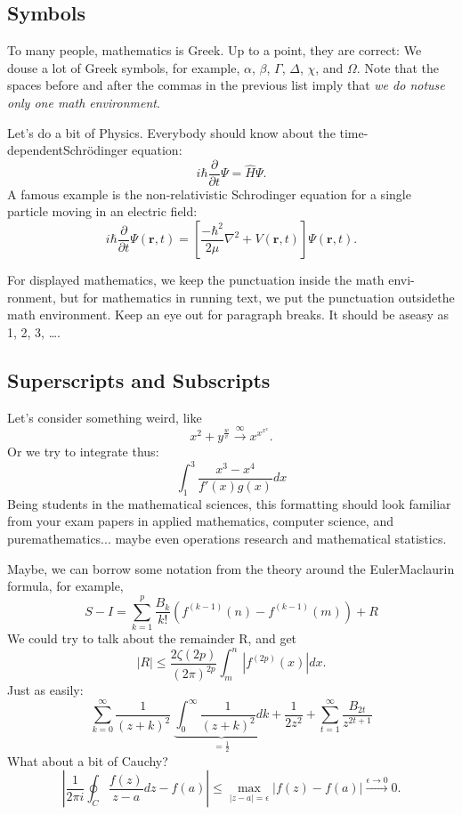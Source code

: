 \documentclass[10pt, a4paper]{article}
\begin{document}
\subsection{Symbols}
To many people, mathematics is Greek. Up to a point, they are correct: We do\linebreak use a lot of Greek symbols, for example, $\alpha$, $\beta$, $\Gamma$, $\Delta$, $\chi$, and $\Omega$. Note that the
spaces before and after the commas in the previous list imply that \textit{we do notuse only one math environment}.\par Let's do a bit of Physics. Everybody should know about the time-dependent\linebreak Schr\"odinger equation:
\[i \hbar \frac{\partial}{\partial t} \Psi = \widehat{H}\Psi .\]
A famous example is the non-relativistic Schrodinger equation for a single particle moving in an electric field:
\[i \hbar \frac{\partial}{\partial t} \Psi (\mathbf{r},t) = \left[\frac{-\hbar^2}{2\mu}\nabla^2 + V(\mathbf{r},t)\right]\Psi(\mathbf{r},t).\]\par

For displayed mathematics, we keep the punctuation inside the math envi-ronment, but for mathematics in running text, we put the punctuation outside\linebreak the math environment. Keep an eye out for paragraph breaks. It should be as\linebreak easy as 1, 2, 3, \ldots .

\subsection{Superscripts and Subscripts}
Let’s consider something weird, like
\[x^2 + y^\frac{w}{v} \stackrel{\infty}{\longrightarrow} x^{x^{x^{x}}}.\]
Or we try to integrate thus:\\
\[\int^{3}_{1}\frac{x^3-x^4}{f'(x)g(x)}dx\]
Being students in the mathematical sciences, this formatting should look familiar from your exam papers in applied mathematics, computer science, and pure\linebreak mathematics... maybe even operations research and mathematical statistics.\par
Maybe, we can borrow some notation from the theory around the Euler\-Maclaurin formula, for example,
\[S-I=\sum^{p}_{k=1}\frac{B_k}{k!}\left(f^{(k-1)}(n)-f^{(k-1)}(m)\right)+R\]
We could try to talk about the remainder R, and get
\[\left| R\right| \leq\frac{2\zeta(2p)}{(2\pi)^{2p}}\int^{n}_{m}\left| f^{(2p)}(x)\right| dx.\]
Just as easily:
\[\sum^{\infty}_{k=0}\frac{1}{(z+k)^2}~\underbrace{\int^{\infty}_{0}\frac{1}{(z+k)^2}dk}_{=\frac{1}{2}}+\frac{1}{2z^2}+\sum^{\infty}_{t=1}\frac{B_{2t}}{z^{2t+1}}\]
What about a bit of Cauchy?
\[\left|\frac{1}{2\pi i}\oint_{C}\frac{f(z)}{z-a}dz-f(a)\right|\leq\displaystyle\max_{\left|z-a\right|=\epsilon}\left|f(z)-f(a)\right|\stackrel{\epsilon\rightarrow 0}{\longrightarrow}0.\]
\end{document}

